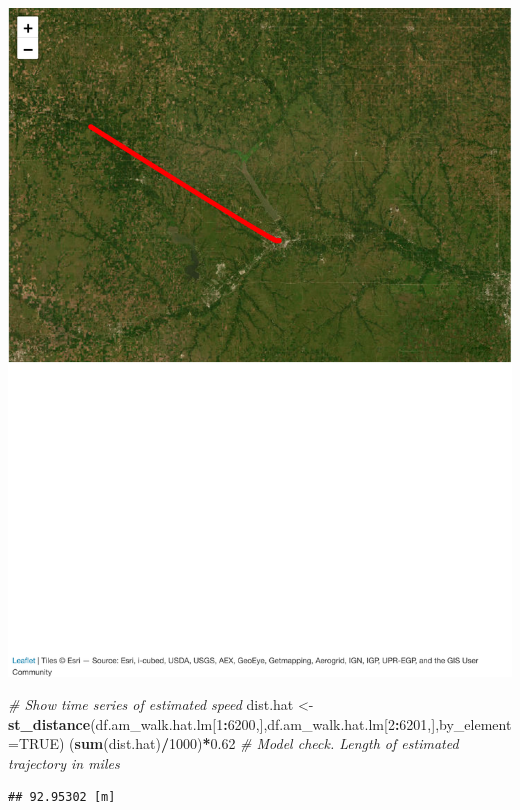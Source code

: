\documentclass[
]{book}
\newenvironment{Shaded}{\begin{snugshade}}{\end{snugshade}}
\newcommand{\AttributeTok}[1]{\textcolor[rgb]{0.13,0.29,0.53}{#1}}
\newcommand{\CommentTok}[1]{\textcolor[rgb]{0.56,0.35,0.01}{\textit{#1}}}
\newcommand{\ConstantTok}[1]{\textcolor[rgb]{0.56,0.35,0.01}{#1}}
\newcommand{\DecValTok}[1]{\textcolor[rgb]{0.00,0.00,0.81}{#1}}
\newcommand{\FloatTok}[1]{\textcolor[rgb]{0.00,0.00,0.81}{#1}}
\newcommand{\FunctionTok}[1]{\textcolor[rgb]{0.13,0.29,0.53}{\textbf{#1}}}
\newcommand{\NormalTok}[1]{#1}
\newcommand{\OtherTok}[1]{\textcolor[rgb]{0.56,0.35,0.01}{#1}}
\newcommand{\SpecialCharTok}[1]{\textcolor[rgb]{0.81,0.36,0.00}{\textbf{#1}}}
\begin{document}
\includegraphics{_main_files/figure-latex/unnamed-chunk-7-2.pdf}

\begin{Shaded}
\begin{Highlighting}[]
\CommentTok{\# Show time series of estimated speed}
\NormalTok{dist.hat }\OtherTok{\textless{}{-}} \FunctionTok{st\_distance}\NormalTok{(df.am\_walk.hat.lm[}\DecValTok{1}\SpecialCharTok{:}\DecValTok{6200}\NormalTok{,],df.am\_walk.hat.lm[}\DecValTok{2}\SpecialCharTok{:}\DecValTok{6201}\NormalTok{,],}\AttributeTok{by\_element=}\ConstantTok{TRUE}\NormalTok{)}
\NormalTok{(}\FunctionTok{sum}\NormalTok{(dist.hat)}\SpecialCharTok{/}\DecValTok{1000}\NormalTok{)}\SpecialCharTok{*}\FloatTok{0.62} \CommentTok{\# Model check. Length of estimated trajectory in miles}
\end{Highlighting}
\end{Shaded}

\begin{verbatim}
## 92.95302 [m]
\end{verbatim}
\end{document}
